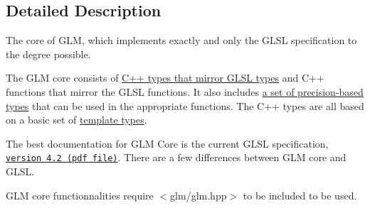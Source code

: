 \subsection{Detailed Description}
The core of GLM, which implements exactly and only the GLSL specification to the degree possible. 

The GLM core consists of \hyperlink{group__core__types}{C++ types that mirror GLSL types} and C++ functions that mirror the GLSL functions. It also includes \hyperlink{group__core__precision}{a set of precision-based types} that can be used in the appropriate functions. The C++ types are all based on a basic set of \hyperlink{group__core__template}{template types}.

The best documentation for GLM Core is the current GLSL specification, \href{http://www.opengl.org/registry/doc/GLSLangSpec.4.20.8.clean.pdf}{\tt version 4.2 (pdf file)}. There are a few differences between GLM core and GLSL.

GLM core functionnalities require $<$glm/glm.hpp$>$ to be included to be used. 
